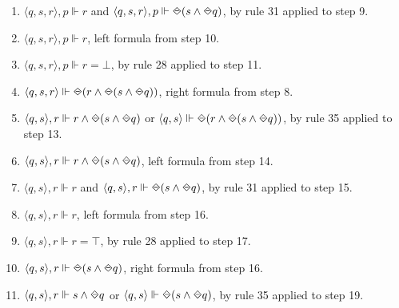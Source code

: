 \begin{myEx}
\begin{enumerate}
\item $\langle q,s,r \rangle, p \Vdash r$ and $ \langle q,s,r \rangle, p \Vdash \LTLonce(s \land \LTLonce q)$, by rule 31 applied to step 9.\\ %

\item $\langle q,s,r \rangle, p \Vdash r$, left formula from step 10.\\ %

\item $\langle q,s,r \rangle, p \Vdash r = \bot$, by rule 28 applied to step 11.\\ %

\item $\langle q,s,r \rangle \Vdash \LTLonce(r \land \LTLonce(s \land \LTLonce q))$, right formula from step 8.\\ %

\item $\langle q,s \rangle, r \Vdash r \land \LTLonce(s \land \LTLonce q)$ or $\langle q,s \rangle \Vdash \LTLonce(r \land \LTLonce(s \land \LTLonce q))$, by rule 35 applied to step 13.\\ %

\item $\langle q,s \rangle, r \Vdash r \land \LTLonce(s \land \LTLonce q)$, left formula from step 14.\\ %

\item $\langle q,s \rangle, r \Vdash r$ and $\langle q,s \rangle, r \Vdash \LTLonce(s \land \LTLonce q)$, by rule 31 applied to step 15.\\ %

\item $\langle q,s \rangle, r \Vdash r$, left formula from step 16.\\ %

\item $\langle q,s \rangle, r \Vdash r = \top$, by rule 28 applied to step 17.\\ %

\item $\langle q,s \rangle, r \Vdash \LTLonce(s \land \LTLonce q)$, right formula from step 16.\\ %

\item $\langle q,s \rangle, r \Vdash s \land \LTLonce q$ or $\langle q,s \rangle \Vdash \LTLonce(s \land \LTLonce q)$, by rule 35 applied to step 19.\\ %


\end{enumerate}
\end{myEx}
